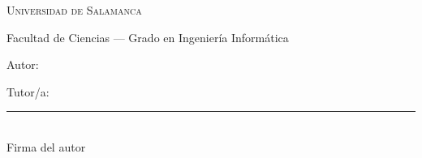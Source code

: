 \thispagestyle{empty}
\begin{center}
\vspace*{1cm}
{\Large\textsc{Universidad de Salamanca}\par}
\vspace{0.3cm}
{\large Facultad de Ciencias --- Grado en Ingeniería Informática\par}
\vfill
{\huge\bfseries \TFGTitulo\par}
\vspace{0.4cm}
{\large \TFGSubtitulo\par}
\vfill
{\large Autor: \TFGAutor\par}
\vspace{0.5cm}
{\large Tutor/a: \TFGTutor\par}
\vfill
\vfill
\vspace{2cm}
\begin{minipage}{0.45\textwidth}
\centering
\rule{0.8\textwidth}{0.4pt}\\[0.2em]
{\small Firma del autor}
\end{minipage}
\vfill
{\large \TFGAnio\par}
\end{center}
\clearpage
